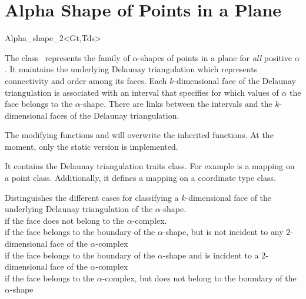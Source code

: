 
\section{Alpha Shape of Points in a Plane \label{I1_SectAlpha_Shape_2}}

\begin{ccClassTemplate} {Alpha_shape_2<Gt,Tds>}

\ccDefinition
The class \ccClassTemplateName\ represents the family of
$\alpha$-shapes of points in a plane for {\em all} positive
$\alpha$. It maintains the underlying Delaunay triangulation which
represents connectivity and order among its faces. Each
$k$-dimensional face of the Delaunay triangulation is associated with
an interval that specifies for which values of $\alpha$ the face
belongs to the $\alpha$-shape. There are links between the intervals
and the $k$-dimensional faces of the Delaunay triangulation.



\ccInheritsFrom


The modifying functions  and  will overwrite
the inherited functions. At the moment, only the static version is implemented.

\ccTypes
{}
\ccThreeToTwo

 
It contains the Delaunay triangulation traits class.  For example
 is a mapping on a point class. Additionally,
it defines a mapping on a coordinate type class.



{Distinguishes the different cases for classifying a $k$-dimensional face
 of the underlying Delaunay triangulation of the $\alpha$-shape. \\
 if the face does not belong to the $\alpha$-complex.\\
 if the face belongs to the boundary of the $\alpha$-shape,
 but is not incident to any 2-dimensional face of the $\alpha$-complex\\
 if the face belongs to the boundary of the $\alpha$-shape
 and is incident to a 2-dimensional face of the $\alpha$-complex\\
 if the face belongs to the $\alpha$-complex, but does
not belong to the boundary of the $\alpha$-shape\\}


\end{ccClassTemplate}

